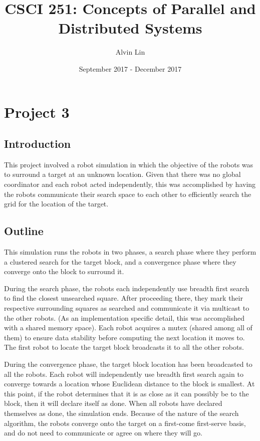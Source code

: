 \documentclass{math}
\title{CSCI 251: Concepts of Parallel and Distributed Systems}
\author{Alvin Lin}
\date{September 2017 - December 2017}
\begin{document}
\maketitle

\section*{Project 3}

\subsection*{Introduction}
This project involved a robot simulation in which the objective of the robots
was to surround a target at an unknown location. Given that there was no global
coordinator and each robot acted independently, this was accomplished by having
the robots communicate their search space to each other to efficiently search
the grid for the location of the target.

\subsection*{Outline}
This simulation runs the robots in two phases, a search phase where they perform
a clustered search for the target block, and a convergence phase where they
converge onto the block to surround it. \par
During the search phase, the robots each independently use breadth first search
to find the closest unsearched square. After proceeding there, they mark their
respective surrounding squares as searched and communicate it via multicast to
the other robots. (As an implementation specific detail, this was accomplished
with a shared memory space). Each robot acquires a mutex (shared among all of
them) to ensure data stability before computing the next location it moves to.
The first robot to locate the target block broadcasts it to all the other
robots. \par
During the convergence phase, the target block location has been broadcasted to
all the robots. Each robot will independently use breadth first search again to
converge towards a location whose Euclidean distance to the block is smallest.
At this point, if the robot determines that it is as close as it can possibly
be to the block, then it will declare itself as done. When all robots have
declared themselves as done, the simulation ends. Because of the nature of the
search algorithm, the robots converge onto the target on a first-come
first-serve basis, and do not need to communicate or agree on where they will
go.
\end{document}
